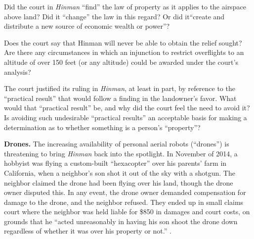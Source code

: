 
\item Did the court in \textit{Hinman} ``find'' the law of property as it
applies to the airspace above land? Did it ``change'' the law in this regard?
Or did it``create and distribute a new source of economic wealth or power''?

\item Does the court say that Hinman will never be able to obtain the relief
sought? Are there any circumstances in which an injunction to restrict
overflights to an altitude of over 150 feet (or any altitude) could be awarded
under the court's analysis?

\item The court justified its ruling in \textit{Hinman}, at least in part, by
reference to the ``practical result'' that would follow a finding in the
landowner's favor. What would that ``practical result'' be, and why did the
court feel the need to avoid it? Is avoiding such undesirable ``practical
results'' an acceptable basis for making a determination as to whether
something is a person's ``property''?


\item \textbf{Drones.} The increasing availability of personal aerial robots
(``drones'') is threatening to bring \textit{Hinman} back into the spotlight.
In November of 2014, a hobbyist was flying a custom-built ``hexacopter'' over
his parents' farm in California, when a neighbor's son shot it out of the sky
with a shotgun. The neighbor claimed the drone had been flying over his land,
though the drone owner disputed this. In any event, the drone owner demanded
compensation for damage to the drone, and the neighbor refused. They ended up
in small claims court where the neighbor was held liable for \$850 in damages
and court costs, on grounds that he ``acted unreasonably in having his son
shoot the drone down regardless of whether it was over his property or not.''
.

